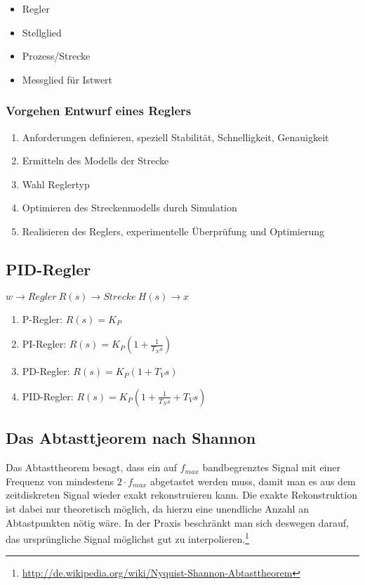 \begin{itemize}
	\item Regler
	\item Stellglied
	\item Prozess/Strecke
	\item Messglied für Istwert
\end{itemize}

\subsubsection{Vorgehen Entwurf eines Reglers}
\begin{enumerate}
	\item Anforderungen definieren, speziell Stabilität, Schnelligkeit, Genauigkeit
	\item Ermitteln des Modells der Strecke
	\item Wahl Reglertyp
	\item Optimieren des Streckenmodells durch Simulation
	\item Realisieren des Reglers, experimentelle Überprüfung und Optimierung
\end{enumerate}


\subsection{PID-Regler}
\(w \rightarrow Regler~R(s) \rightarrow Strecke~H(s) \rightarrow x\)

\begin{enumerate}
	\item P-Regler: \(R(s) = K_P\)
	\item PI-Regler: \(R(s) = K_P(1+\frac{1}{T_Ns})\)
	\item PD-Regler: \(R(s) = K_P(1+T_Vs)\)
	\item PID-Regler: \(R(s) = K_P(1+\frac{1}{T_Ns}+T_Vs)\)
\end{enumerate}


\subsection{Das Abtasttjeorem nach Shannon}
Das Abtasttheorem besagt, dass ein auf \(f_{max}\) bandbegrenztes Signal mit einer Frequenz von mindestens \(2\cdot f_{max}\) abgetastet werden muss, damit man es aus dem zeitdiskreten Signal wieder exakt rekonstruieren kann. Die exakte Rekonstruktion ist dabei nur theoretisch möglich, da hierzu eine unendliche Anzahl an Abtastpunkten nötig wäre. In der Praxis beschränkt man sich deswegen darauf, das ursprüngliche Signal möglichst gut zu interpolieren.\footnote{\url{http://de.wikipedia.org/wiki/Nyquist-Shannon-Abtasttheorem}}

